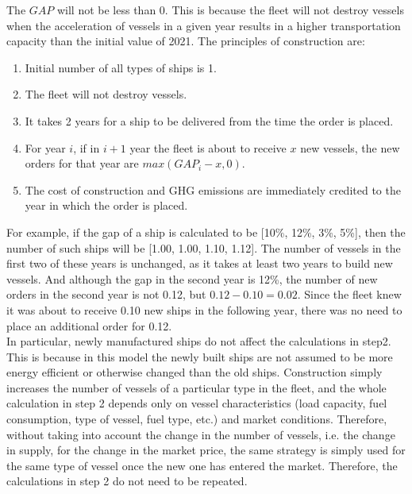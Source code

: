 \documentclass[a4paper,12pt]{article}
\begin{document}
The $GAP$ will not be less than 0.
This is because the fleet will not destroy vessels when the acceleration of vessels in a given year results in a higher transportation capacity than the initial value of 2021.
The principles of construction are:
\begin{enumerate}
	\item Initial number of all types of ships is 1.
	\item The fleet will not destroy vessels.
	\item It takes 2 years for a ship to be delivered from the time the order is placed.
	\item For year $i$, if in $i+1$ year the fleet is about to receive $x$ new vessels, the new orders for that year are $max(GAP_i - x, 0)$.
	\item The cost of construction and GHG emissions are immediately credited to the year in which the order is placed.
\end{enumerate}


For example, if the gap of a ship is calculated to be [10\%, 12\%, 3\%, 5\%], then the number of such ships will be [1.00, 1.00, 1.10, 1.12].
The number of vessels in the first two of these years is unchanged, as it takes at least two years to build new vessels.
And although the gap in the second year is 12\%, the number of new orders in the second year is not 0.12, but $0.12-0.10=0.02$.
Since the fleet knew it was about to receive 0.10 new ships in the following year, there was no need to place an additional order for 0.12.\\

In particular, newly manufactured ships do not affect the calculations in step2.
This is because in this model the newly built ships are not assumed to be more energy efficient or otherwise changed than the old ships.
Construction simply increases the number of vessels of a particular type in the fleet, and the whole calculation in step 2 depends only on vessel characteristics (load capacity, fuel consumption, type of vessel, fuel type, etc.) and market conditions.
Therefore, without taking into account the change in the number of vessels, i.e. the change in supply, for the change in the market price, the same strategy is simply used for the same type of vessel once the new one has entered the market.
Therefore, the calculations in step 2 do not need to be repeated.
\end{document}
